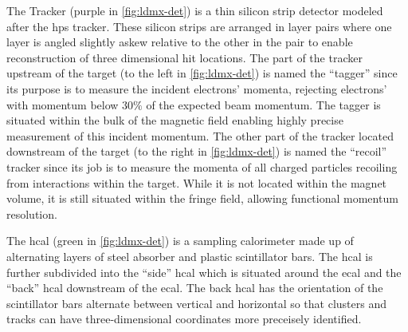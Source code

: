 The Tracker (purple in \cref{fig:ldmx-det}) is a thin silicon strip detector modeled after the
\ac{hps} tracker. These silicon strips are arranged in layer pairs where one layer is angled
slightly askew relative to the other in the pair to enable reconstruction of three dimensional hit
locations. The part of the tracker upstream of the target (to the left in \cref{fig:ldmx-det}) is
named the ``tagger'' since its purpose is to measure the incident electrons' momenta, rejecting
electrons' with momentum below $30\%$ of the expected beam momentum. The tagger is situated within
the bulk of the magnetic field enabling highly precise measurement of this incident momentum. The
other part of the tracker located downstream of the target (to the right in \cref{fig:ldmx-det}) is
named the ``recoil'' tracker since its job is to measure the momenta of all charged particles
recoiling from interactions within the target. While it is not located within the magnet volume, it
is still situated within the fringe field, allowing functional momentum resolution.

The \ac{hcal} (green in \cref{fig:ldmx-det}) is a sampling calorimeter made up of alternating
layers of steel absorber and plastic scintillator bars. The \ac{hcal} is further subdivided into
the ``side'' \ac{hcal} which is situated around the \ac{ecal} and the ``back'' \ac{hcal}
downstream of the \ac{ecal}. The back \ac{hcal} has the orientation of the scintillator bars
alternate between vertical and horizontal so that clusters and tracks can have three-dimensional
coordinates more preceisely identified.

